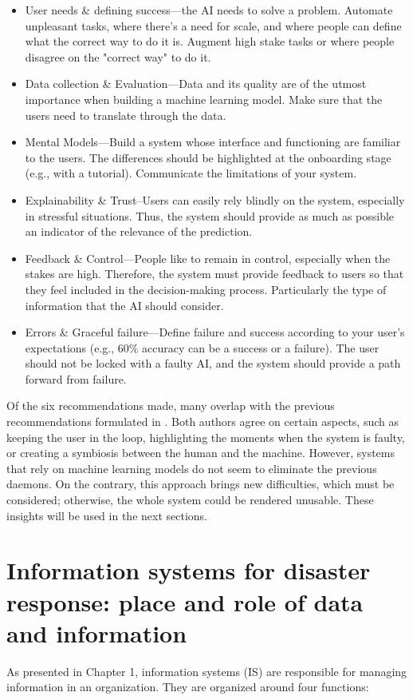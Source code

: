 \begin{itemize}
    \item User needs \& defining success—the AI needs to solve a problem.
          Automate unpleasant tasks, where there's a need for scale, and where people can define what the correct way to do it is.
          Augment high stake tasks or where people disagree on the "correct way" to do it.
    \item Data collection \& Evaluation—Data and its quality are of the utmost importance when building a machine learning model.
          Make sure that the users need to translate through the data.
    \item Mental Models—Build a system whose interface and functioning are familiar to the users.
          The differences should be highlighted at the onboarding stage (e.g., with a tutorial).
          Communicate the limitations of your system.
    \item Explainability \& Trust–Users can easily rely blindly on the system, especially in stressful situations.
          Thus, the system should provide as much as possible an indicator of the relevance of the prediction.
    \item Feedback \& Control—People like to remain in control, especially when the stakes are high.
          Therefore, the system must provide feedback to users so that they feel included in the decision-making process.
          Particularly the type of information that the AI should consider.
    \item Errors \& Graceful failure—Define failure and success according to your user's expectations (e.g., 60\% accuracy can be a success or a failure).
          The user should not be locked with a faulty AI, and the system should provide a path forward from failure.
\end{itemize}

Of the six recommendations made, many overlap with the previous recommendations formulated in \textcite{endsleyDesigningSituationAwareness2016}.
Both authors agree on certain aspects, such as keeping the user in the loop, highlighting the moments when the system is faulty, or creating a symbiosis between the human and the machine.
However, systems that rely on machine learning models do not seem to eliminate the previous daemons.
On the contrary, this approach brings new difficulties, which must be considered; otherwise, the whole system could be rendered unusable.
These insights will be used in the next sections.

\section{Information systems for disaster response: place and role of data and information}
As presented in Chapter 1, information systems (IS) are responsible for managing information in an organization.
They are organized around four functions:


